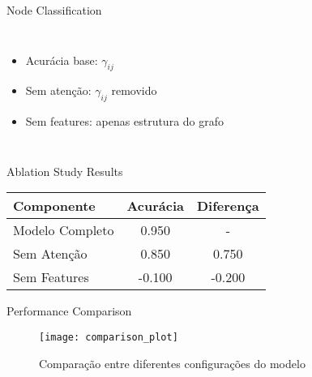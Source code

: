 \documentclass{beamer}
\begin{document}
\begin{frame}{Node Classification}
\begin{columns}
    \begin{itemize}
        \item Acurácia base: $\gamma_{ij}$
        \item Sem atenção: $\gamma_{ij}$ removido
        \item Sem features: apenas estrutura do grafo
    \end{itemize}
\end{columns}
\end{frame}
\begin{frame}{Ablation Study Results}
\begin{table}
\begin{tabular}{lcc}
\toprule
Componente & Acurácia & Diferença \\
\midrule
Modelo Completo & 0.950 & - \\
Sem Atenção & 0.850 & 0.750 \\
Sem Features & -0.100 & -0.200 \\
\bottomrule
\end{tabular}
\end{table}
\end{frame}
\begin{frame}{Performance Comparison}
\begin{figure}
\texttt{[image: comparison\_plot]}
\caption{Comparação entre diferentes configurações do modelo}
\end{figure}
\end{frame}
\end{document}
